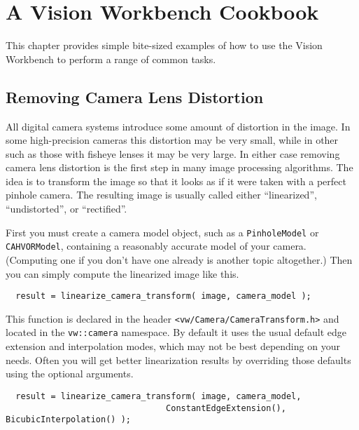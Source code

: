 \chapter{A Vision Workbench Cookbook}\label{ch:cookbook}

This chapter provides simple bite-sized examples of how to use the 
Vision Workbench to perform a range of common tasks.

\vfill\eject
\section{Removing Camera Lens Distortion}\label{sec:cookbook.distortion}
All digital camera systems introduce some amount of distortion in the 
image.  In some high-precision cameras this distortion may be very small, 
while in other such as those with fisheye lenses it may be very large.  
In either case removing camera lens distortion is the first step in many 
image processing algorithms.  The idea is to transform the image so that 
it looks as if it were taken with a perfect pinhole camera.  The resulting 
image is usually called either ``linearized'', ``undistorted'', or ``rectified''.

First you must create a camera model object, such as a \verb#PinholeModel# or 
\verb#CAHVORModel#, containing a reasonably accurate model of your camera.
(Computing one if you don't have one already is another topic altogether.) 
Then you can simply compute the linearized image like this.
\begin{verbatim}
  result = linearize_camera_transform( image, camera_model );
\end{verbatim}
This function is declared in the header \verb#<vw/Camera/CameraTransform.h># 
and located in the \verb#vw::camera# namespace.  By default it uses 
the usual default edge extension and interpolation modes, which may not 
be best depending on your needs.  Often you will get better linearization 
results by overriding those defaults using the optional arguments.
\begin{verbatim}
  result = linearize_camera_transform( image, camera_model,
                                ConstantEdgeExtension(), BicubicInterpolation() );
\end{verbatim}

